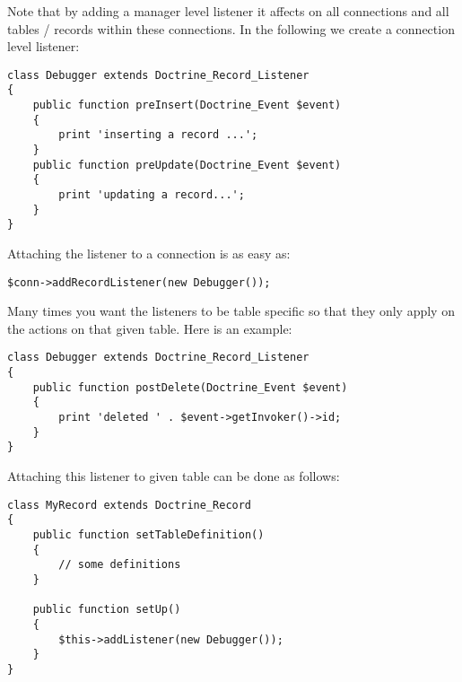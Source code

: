 \documentclass[11pt,a4paper]{report}
\begin{document}
Note that by adding a manager level listener it affects on all connections and all tables / records within these connections. In the following we create a connection level listener:

\begin{verbatim}
class Debugger extends Doctrine_Record_Listener
{
    public function preInsert(Doctrine_Event $event)
    {
        print 'inserting a record ...';
    }
    public function preUpdate(Doctrine_Event $event)
    {
        print 'updating a record...';
    }
}
\end{verbatim}

Attaching the listener to a connection is as easy as:

\begin{verbatim}
$conn->addRecordListener(new Debugger());
\end{verbatim}

Many times you want the listeners to be table specific so that they only apply on the actions on that given table. Here is an example:

\begin{verbatim}
class Debugger extends Doctrine_Record_Listener
{
    public function postDelete(Doctrine_Event $event)
    {
        print 'deleted ' . $event->getInvoker()->id;
    }
}
\end{verbatim}

Attaching this listener to given table can be done as follows:

\begin{verbatim}
class MyRecord extends Doctrine_Record
{
    public function setTableDefinition()
    {
        // some definitions
    }

    public function setUp()
    {
        $this->addListener(new Debugger());
    }
}
\end{verbatim}
\end{document}
